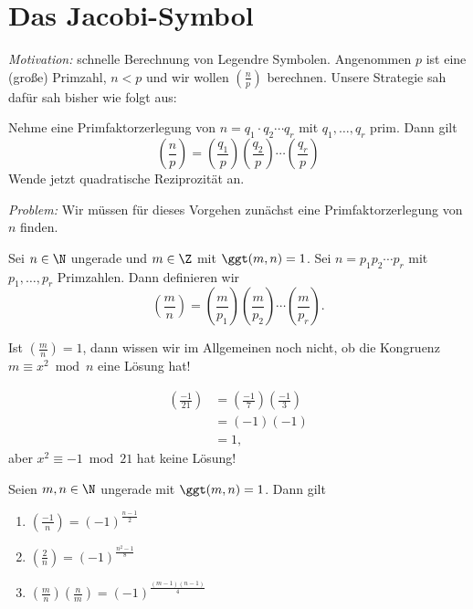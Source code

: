 \section{Das Jacobi-Symbol}\addtocounter{video}{1}

\emph{Motivation:} schnelle Berechnung von Legendre Symbolen. Angenommen $p$ ist eine (große) Primzahl, $n < p$ und wir wollen $\left(\frac{n}{p}\right)$ berechnen. Unsere Strategie sah dafür sah bisher wie folgt aus:\video{}

Nehme eine Primfaktorzerlegung von $n = q_1 \cdot q_2 \dotsm q_r$ mit $q_1,\dotsc,q_r$ prim. Dann gilt
\[ \left(\frac{n}{p}\right) = \left(\frac{q_1}{p}\right) \left(\frac{q_2}{p}\right) \dotsm \left(\frac{q_r}{p}\right) \]
Wende jetzt quadratische Reziprozität an.

\emph{Problem:} Wir müssen für dieses Vorgehen zunächst eine Primfaktorzerlegung von $n$ finden.

\begin{defn*}
	Sei $n \in \N$ ungerade und $m \in \Z$ mit $\ggt(m,n)=1$. Sei $n = p_1 p_2 \dotsm p_r$ mit $p_1,\dotsc, p_r$ Primzahlen. Dann definieren wir
	\[ \left(\frac{m}{n}\right) = \left(\frac{m}{p_1}\right) \left(\frac{m}{p_2}\right) \dotsm \left(\frac{m}{p_r}\right). \]
\end{defn*}

\begin{cav*}
	Ist $\left(\frac{m}{n}\right)=1$, dann wissen wir im Allgemeinen noch nicht, ob die Kongruenz $m \equiv x^2 \bmod n$ eine Lösung hat!
\end{cav*}

\begin{exmp*}
	\begin{align*}
		\left(\frac{-1}{21}\right) &= \left(\frac{-1}{7}\right) \left(\frac{-1}{3}\right)\\
		&= (-1)(-1)\\
		&=1,
	\end{align*}
	aber $x^2 \equiv -1 \bmod 21$ hat keine Lösung!
\end{exmp*}

\begin{thm}\autolabel
	Seien $m,n \in \N$ ungerade mit $\ggt(m,n)=1$. Dann gilt
	\begin{enumerate}[label={\roman*})]
		\item $\left(\frac{-1}{n}\right) = (-1)^\frac{n-1}{2}$
		\item \( \left(\frac{2}{n}\right) = (-1)^\frac{n^2-1}{8} \)
		\item \( \left(\frac{m}{n}\right) \left(\frac{n}{m}\right) = (-1)^\frac{(m-1)(n-1)}{4} \)
	\end{enumerate}
\end{thm}